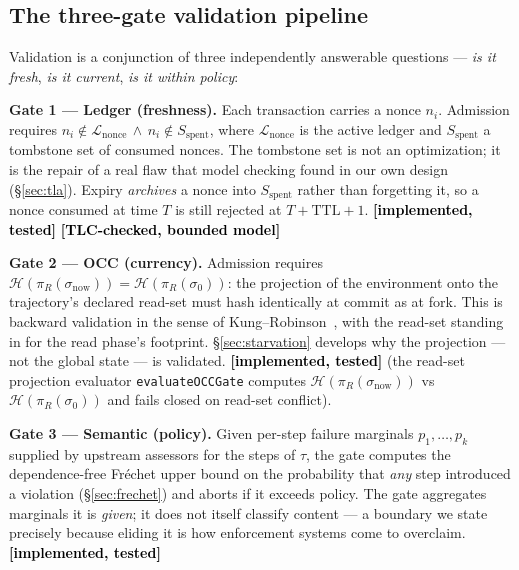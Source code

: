 \documentclass[10pt,twocolumn,letterpaper]{article}
\newcommand{\piR}{\pi_R}
\newcommand{\statusimpl}[0]{\textcolor{black}{\textbf{[implemented, tested]}}}
\newcommand{\statusmodel}[0]{\textcolor{black}{\textbf{[TLC-checked, bounded model]}}}
\begin{document}
\subsection{The three-gate validation pipeline}
\label{sec:gates}

Validation is a conjunction of three independently answerable questions ---
\emph{is it fresh}, \emph{is it current}, \emph{is it within policy}:

\textbf{Gate 1 --- Ledger (freshness).} Each transaction carries a nonce
$n_i$. Admission requires
$n_i \notin \mathcal{L}_{\mathrm{nonce}} \,\wedge\, n_i \notin S_{\mathrm{spent}}$,
where $\mathcal{L}_{\mathrm{nonce}}$ is the active ledger and
$S_{\mathrm{spent}}$ a tombstone set of consumed nonces. The tombstone set is
not an optimization; it is the repair of a real flaw that model checking
found in our own design (\S\ref{sec:tla}). Expiry \emph{archives} a nonce
into $S_{\mathrm{spent}}$ rather than forgetting it, so a nonce consumed at
time $T$ is still rejected at $T+\mathrm{TTL}+1$. \statusimpl{}
\statusmodel{}

\textbf{Gate 2 --- OCC (currency).} Admission requires
$\mathcal{H}(\piR(\sigma_{\mathrm{now}})) = \mathcal{H}(\piR(\sigma_0))$:
the projection of the environment onto the trajectory's declared read-set
must hash identically at commit as at fork. This is backward validation in
the sense of Kung--Robinson~\cite{kung1981occ}, with the read-set standing in
for the read phase's footprint. \S\ref{sec:starvation} develops why the
projection --- not the global state --- is validated. \statusimpl{} (the
read-set projection evaluator \texttt{evaluateOCCGate} computes $\mathcal{H}(\pi_R(\sigma_{\mathrm{now}}))$ vs $\mathcal{H}(\pi_R(\sigma_0))$ and fails closed on read-set conflict).

\textbf{Gate 3 --- Semantic (policy).} Given per-step failure marginals
$p_1,\dots,p_k$ supplied by upstream assessors for the steps of $\tau$, the
gate computes the dependence-free Fr\'echet upper bound on the probability
that \emph{any} step introduced a violation
(\S\ref{sec:frechet}) and aborts if it exceeds policy. The gate aggregates
marginals it is \emph{given}; it does not itself classify content ---
a boundary we state precisely because eliding it is how enforcement systems
come to overclaim. \statusimpl{}
\end{document}
